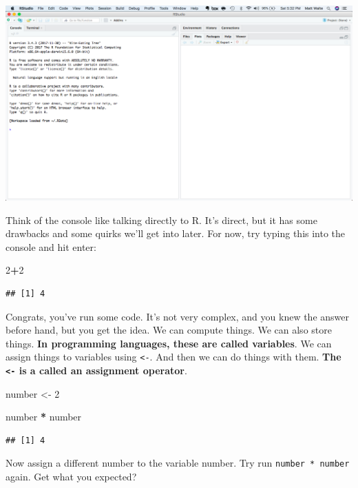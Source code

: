 \documentclass[]{book}
\newenvironment{Shaded}{\begin{snugshade}}{\end{snugshade}}
\newcommand{\DecValTok}[1]{\textcolor[rgb]{0.00,0.00,0.81}{#1}}
\newcommand{\NormalTok}[1]{#1}
\newcommand{\OperatorTok}[1]{\textcolor[rgb]{0.81,0.36,0.00}{\textbf{#1}}}
\newcommand{\StringTok}[1]{\textcolor[rgb]{0.31,0.60,0.02}{#1}}
\begin{document}
\includegraphics[width=18.97in]{images/verybasics1}

Think of the console like talking directly to R. It's direct, but it has some drawbacks and some quirks we'll get into later. For now, try typing this into the console and hit enter:

\begin{Shaded}
\begin{Highlighting}[]
\DecValTok{2}\OperatorTok{+}\DecValTok{2}
\end{Highlighting}
\end{Shaded}

\begin{verbatim}
## [1] 4
\end{verbatim}

Congrats, you've run some code. It's not very complex, and you knew the answer before hand, but you get the idea. We can compute things. We can also store things. \textbf{In programming languages, these are called variables}. We can assign things to variables using \texttt{\textless{}-}. And then we can do things with them. \textbf{The \texttt{\textless{}-} is a called an assignment operator}.

\begin{Shaded}
\begin{Highlighting}[]
\NormalTok{number <-}\StringTok{ }\DecValTok{2}

\NormalTok{number }\OperatorTok{*}\StringTok{ }\NormalTok{number}
\end{Highlighting}
\end{Shaded}

\begin{verbatim}
## [1] 4
\end{verbatim}

Now assign a different number to the variable number. Try run \texttt{number\ *\ number} again. Get what you expected?
\end{document}
